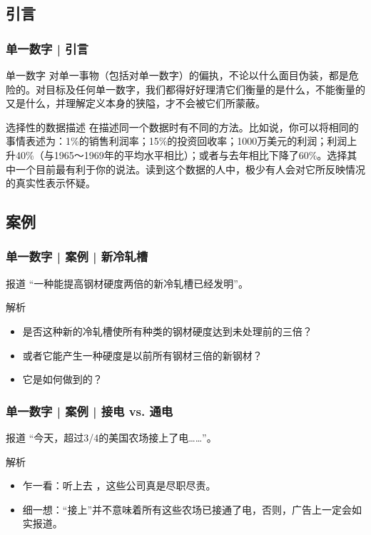 \subsection{引言}
\begin{frame}
  \frametitle{单一数字 | 引言}
  \begin{block}{单一数字}
对单一事物（包括对单一数字）的偏执，不论以什么面目伪装，都是危险的。对目标及任何单一数字，我们都得好好理清它们衡量的是什么，不能衡量的又是什么，并理解定义本身的狭隘，才不会被它们所蒙蔽。
  \end{block}
  \pause
  \begin{block}{选择性的数据描述}
在描述同一个数据时有不同的方法。比如说，你可以将相同的事情表述为：1\%的销售利润率；15\%的投资回收率；1000万美元的利润；利润上升40\%（与1965～1969年的平均水平相比）；或者与去年相比下降了60\%。选择其中一个目前最有利于你的说法。读到这个数据的人中，极少有人会对它所反映情况的真实性表示怀疑。
  \end{block}
\end{frame}

\subsection{案例}
\begin{frame}
  \frametitle{单一数字 | 案例 | 新冷轧槽}
  \begin{block}{报道}
    “一种能提高钢材硬度两倍的新冷轧槽已经发明”。
  \end{block}
  \pause \pause \pause \pause
  \begin{block}{解析}
    \begin{itemize}
      \item 是否这种新的冷轧槽使所有种类的钢材硬度达到未处理前的三倍？
      \item 或者它能产生一种硬度是以前所有钢材三倍的新钢材？
      \item 它是如何做到的？
    \end{itemize}
  \end{block}
\end{frame}

\begin{frame}
  \frametitle{单一数字 | 案例 | 接电 vs. 通电}
  \begin{block}{报道}
  “今天，超过3/4的美国农场接上了电……”。
  \end{block}
  \pause \pause \pause \pause
  \begin{block}{解析}
    \begin{itemize}
      \item 乍一看：听上去 ，这些公司真是尽职尽责。
      \item 细一想：“接上”并不意味着所有这些农场已接通了电，否则，广告上一定会如实报道。
    \end{itemize}
  \end{block}
\end{frame}

